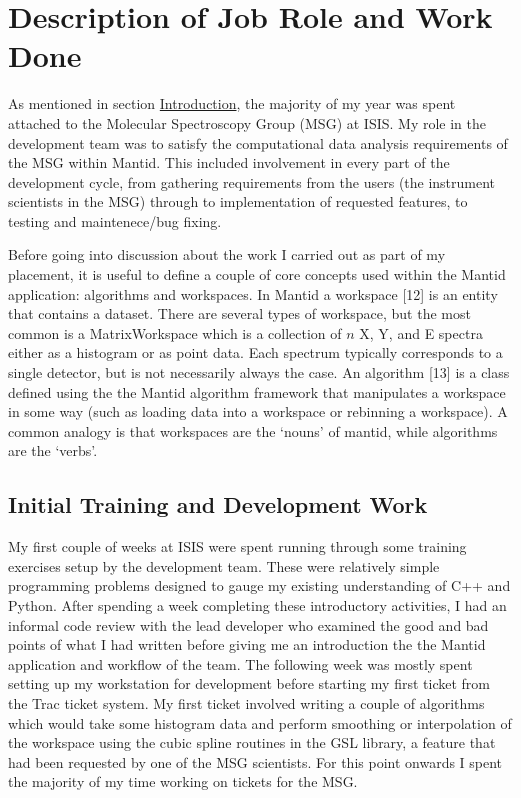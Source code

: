 \documentclass[paper=a4, fontsize=11pt]{scrartcl}	%
\numberwithin{equation}{section}															%
\numberwithin{figure}{section}																%
\numberwithin{table}{section}
\begin{document}
\section{Description of Job Role and Work
Done}\label{description-of-job-role-and-work-done}

As mentioned in section \hyperref[introduction]{Introduction}, the
majority of my year was spent attached to the Molecular Spectroscopy
Group (MSG) at ISIS. My role in the development team was to satisfy the
computational data analysis requirements of the MSG within Mantid. This
included involvement in every part of the development cycle, from
gathering requirements from the users (the instrument scientists in the
MSG) through to implementation of requested features, to testing and
maintenece/bug fixing.

Before going into discussion about the work I carried out as part of my
placement, it is useful to define a couple of core concepts used within
the Mantid application: algorithms and workspaces. In Mantid a workspace
{[}12{]} is an entity that contains a dataset. There are several types
of workspace, but the most common is a MatrixWorkspace which is a
collection of $n$ X, Y, and E spectra either as a histogram or as point
data. Each spectrum typically corresponds to a single detector, but is
not necessarily always the case. An algorithm {[}13{]} is a class
defined using the the Mantid algorithm framework that manipulates a
workspace in some way (such as loading data into a workspace or
rebinning a workspace). A common analogy is that workspaces are the
`nouns' of mantid, while algorithms are the `verbs'.

\subsection{Initial Training and Development
Work}\label{initial-training-and-development-work}

My first couple of weeks at ISIS were spent running through some
training exercises setup by the development team. These were relatively
simple programming problems designed to gauge my existing understanding
of C++ and Python. After spending a week completing these introductory
activities, I had an informal code review with the lead developer who
examined the good and bad points of what I had written before giving me
an introduction the the Mantid application and workflow of the team. The
following week was mostly spent setting up my workstation for
development before starting my first ticket from the Trac ticket system.
My first ticket involved writing a couple of algorithms which would take
some histogram data and perform smoothing or interpolation of the
workspace using the cubic spline routines in the GSL library, a feature
that had been requested by one of the MSG scientists. For this point
onwards I spent the majority of my time working on tickets for the MSG.
\end{document}
